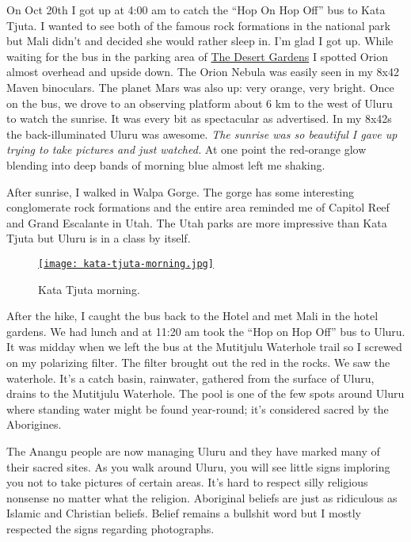 On Oct 20th I got up at 4:00 am to catch the ``Hop On Hop Off'' bus to
Kata Tjuta. I wanted to see both of the famous rock formations in the
national park but Mali didn't and decided she would rather sleep in. I'm
glad I got up. While waiting for the bus in the parking area of
\href{https://www.ayersrockresort.com.au/accommodation/desert-gardens-hotel}{The
Desert Gardens} I spotted Orion almost overhead and upside down. The
Orion Nebula was easily seen in my 8x42 Maven binoculars. The planet
Mars was also up: very orange, very bright. Once on the bus, we drove to
an observing platform about 6 km to the west of Uluru to watch the
sunrise. It was every bit as spectacular as advertised. In my 8x42s the
back-illuminated Uluru was awesome. \emph{The sunrise was so beautiful I
gave up trying to take pictures and just watched.} At one point the
red-orange glow blending into deep bands of morning blue almost left me
shaking.

After sunrise, I walked in Walpa Gorge. The gorge has some interesting
conglomerate rock formations and the entire area reminded me of Capitol
Reef and Grand Escalante in Utah. The Utah parks are more impressive
than Kata Tjuta but Uluru is in a class by itself.

\captionsetup[figure]{labelformat=empty}
\begin{figure}[htbp]
\centering
\href{https://conceptcontrol.smugmug.com/Trips/Overseas/Australia-New-Zealand-2022/i-kSz8XH4/A}{\texttt{[image: kata-tjuta-morning.jpg]}}
\caption{Kata Tjuta morning.}
\label{fig:7573x3}
\end{figure}


After the hike, I caught the bus back to the Hotel and met Mali in the
hotel gardens. We had lunch and at 11:20 am took the ``Hop on Hop Off''
bus to Uluru. It was midday when we left the bus at the Mutitjulu
Waterhole trail so I screwed on my polarizing filter. The filter brought
out the red in the rocks. We saw the waterhole. It's a catch basin,
rainwater, gathered from the surface of Uluru, drains to the Mutitjulu
Waterhole. The pool is one of the few spots around Uluru where standing
water might be found year-round; it's considered sacred by the
Aborigines.

The Anangu people are now managing Uluru and they have marked many of
their sacred sites. As you walk around Uluru, you will see little signs
imploring you not to take pictures of certain areas. It's hard to
respect silly religious nonsense no matter what the religion. Aboriginal
beliefs are just as ridiculous as Islamic and Christian beliefs. Belief
remains a bullshit word but I mostly respected the signs regarding
photographs.

